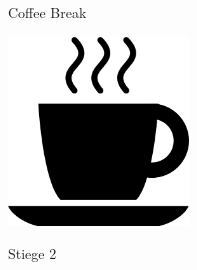 \documentclass[a4paper]{article}
\begin{document}
\printGenericVSLHeader
\begin{center}
\begin{vsltext}{3cm}{3.2cm}

    Coffee Break

    \vspace{1cm}

    \includegraphics[height=5cm, keepaspectratio=true]{coffeecup.png}

    Stiege 2

\end{vsltext}

\end{center}
\end{document}
